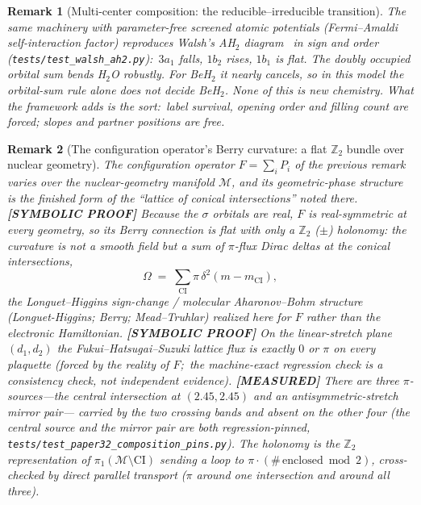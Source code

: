 \documentclass[11pt]{article}
\newtheorem{remark}{Remark}
\begin{document}
\begin{remark}[Multi-center composition: the reducible--irreducible transition]
The same machinery with parameter-free screened atomic potentials
(Fermi--Amaldi self-interaction factor) reproduces Walsh's AH$_2$
diagram~\cite{walsh1953} in sign and order
(\texttt{tests/test\_walsh\_ah2.py}):\ $3a_1$ falls, $1b_2$ rises, $1b_1$ is
flat.  The doubly occupied orbital sum bends H$_2$O robustly.  For BeH$_2$
it nearly cancels, so in this model the orbital-sum rule alone does not
decide BeH$_2$.  None of this is new chemistry.  What the framework adds is
the sort:\ label survival, opening order and filling count are forced;
slopes and partner positions are free.
\end{remark}

\begin{remark}[The configuration operator's Berry curvature: a flat $\mathbb{Z}_2$ bundle over nuclear geometry]
\label{rem:config_berry_curvature}
The configuration operator $F = \sum_i P_i$ of the previous remark varies
over the nuclear-geometry manifold $\mathcal{M}$, and its geometric-phase
structure is the finished form of the ``lattice of conical intersections''
noted there.  \textbf{[SYMBOLIC PROOF]} Because the $\sigma$ orbitals are real, $F$ is real-symmetric
at every geometry, so its Berry connection is \emph{flat} with only a
$\mathbb{Z}_2$ ($\pm$) holonomy: the curvature is not a smooth field but a
sum of $\pi$-flux Dirac deltas at the conical intersections,
\[
  \Omega \;=\; \sum_{\text{CI}} \pi\,\delta^2(m - m_{\text{CI}}),
\]
the Longuet--Higgins sign-change / molecular Aharonov--Bohm structure
(Longuet-Higgins; Berry; Mead--Truhlar) realized here for $F$ rather than the
electronic Hamiltonian.  \textbf{[SYMBOLIC PROOF]} On the linear-stretch plane $(d_1, d_2)$ the
Fukui--Hatsugai--Suzuki lattice flux is exactly $0$ or $\pi$ on every
plaquette (forced by the reality of $F$;\ the machine-exact regression
check is a consistency check, not independent evidence).
\textbf{[MEASURED]} There are three $\pi$-sources---the central
intersection at $(2.45, 2.45)$ and an antisymmetric-stretch mirror pair---
carried by the two crossing bands and absent on the other four (the
central source and the mirror pair are both regression-pinned,
\texttt{tests/test\_paper32\_composition\_pins.py}).  The holonomy
is the $\mathbb{Z}_2$ representation of $\pi_1(\mathcal{M} \setminus
\mathrm{CI})$ sending a loop to $\pi \cdot (\#\,\text{enclosed} \bmod 2)$,
cross-checked by direct parallel transport ($\pi$ around one intersection and
around all three).


\end{remark}
\end{document}
